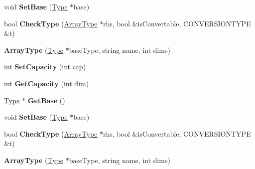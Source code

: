 \begin{DoxyCompactItemize}
\item 
\hypertarget{classArrayType_ae198281d73c175b70c41856ee9bcfbb9}{void {\bfseries Set\-Base} (\hyperlink{classType}{Type} $\ast$base)}\label{classArrayType_ae198281d73c175b70c41856ee9bcfbb9}

\item 
\hypertarget{classArrayType_ad20dee813ec90843a6333e5823e0128a}{bool {\bfseries Check\-Type} (\hyperlink{classArrayType}{Array\-Type} $\ast$rhs, bool \&is\-Convertable, C\-O\-N\-V\-E\-R\-S\-I\-O\-N\-T\-Y\-P\-E \&t)}\label{classArrayType_ad20dee813ec90843a6333e5823e0128a}

\item 
\hypertarget{classArrayType_a90aea374946e0e5cf4b89fc039969f82}{{\bfseries Array\-Type} (\hyperlink{classType}{Type} $\ast$base\-Type, string name, int dims)}\label{classArrayType_a90aea374946e0e5cf4b89fc039969f82}

\item 
\hypertarget{classArrayType_acff47fdbadc911bcb3236dcb9e8dd0a4}{int {\bfseries Set\-Capacity} (int cap)}\label{classArrayType_acff47fdbadc911bcb3236dcb9e8dd0a4}

\item 
\hypertarget{classArrayType_a97ce54630d5df790a8a706cb2f1c5751}{int {\bfseries Get\-Capacity} (int dim)}\label{classArrayType_a97ce54630d5df790a8a706cb2f1c5751}

\item 
\hypertarget{classArrayType_ac874b4e13dba44082d7eec7e057fd74c}{\hyperlink{classType}{Type} $\ast$ {\bfseries Get\-Base} ()}\label{classArrayType_ac874b4e13dba44082d7eec7e057fd74c}

\item 
\hypertarget{classArrayType_ae198281d73c175b70c41856ee9bcfbb9}{void {\bfseries Set\-Base} (\hyperlink{classType}{Type} $\ast$base)}\label{classArrayType_ae198281d73c175b70c41856ee9bcfbb9}

\item 
\hypertarget{classArrayType_ad20dee813ec90843a6333e5823e0128a}{bool {\bfseries Check\-Type} (\hyperlink{classArrayType}{Array\-Type} $\ast$rhs, bool \&is\-Convertable, C\-O\-N\-V\-E\-R\-S\-I\-O\-N\-T\-Y\-P\-E \&t)}\label{classArrayType_ad20dee813ec90843a6333e5823e0128a}

\item 
\hypertarget{classArrayType_a90aea374946e0e5cf4b89fc039969f82}{{\bfseries Array\-Type} (\hyperlink{classType}{Type} $\ast$base\-Type, string name, int dims)}\label{classArrayType_a90aea374946e0e5cf4b89fc039969f82}


\end{DoxyCompactItemize}
